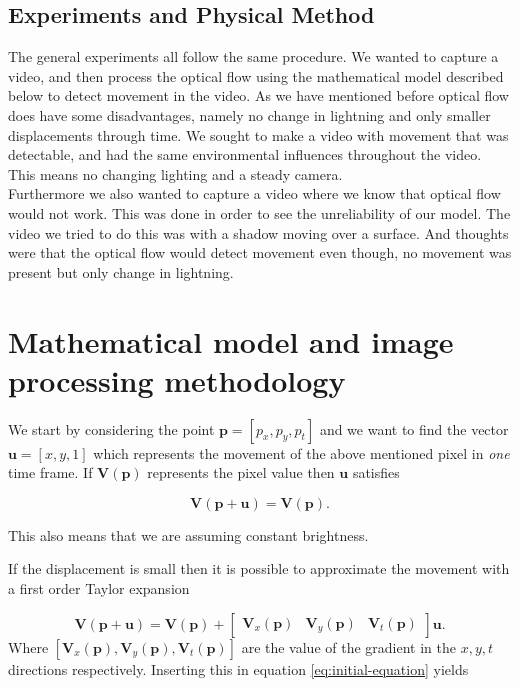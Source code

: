 \documentclass{article}
\begin{document}
\subsection{Experiments and Physical Method}
The general experiments all follow the same procedure. We wanted to capture a video, and then process the optical flow using the mathematical model described below to detect movement in the video.
As we have mentioned before optical flow does have some disadvantages, namely no change in lightning and only smaller displacements through time. We sought to make a video with movement that was detectable, and had the same environmental influences throughout the video. This means no changing lighting and a steady camera.
\\
Furthermore we also wanted to capture a video where we know that optical flow would not work. This was done in order to see the unreliability of our model. The video we tried to do this was with a shadow moving over a surface. And thoughts were that the optical flow would detect movement even though, no movement was present but only change in lightning.


\section{Mathematical model and image processing methodology}
We start by considering the point $\boldsymbol{p} = [p_x, p_y, p_t]$ and we want to find the vector $\boldsymbol{u} = [x, y, 1]$ which represents the movement of the above mentioned pixel in \emph{one} time frame. If $\boldsymbol{V(p)}$ represents the pixel value then $\boldsymbol{u}$ satisfies 

\begin{equation}\label{eq:initial-equation}
    \boldsymbol{V(p + u)} = \boldsymbol{V(p)}.
\end{equation}

This also means that we are assuming constant brightness.

If the displacement is small then it is possible to  approximate the movement with a first order Taylor expansion

\begin{equation}
    \boldsymbol{V(p + u)} = \boldsymbol{V(p)} + \begin{bmatrix}
        \boldsymbol{V}_x(\boldsymbol{p}) & \boldsymbol{V}_y(\boldsymbol{p}) & \boldsymbol{V}_t(\boldsymbol{p})
    \end{bmatrix} \boldsymbol{u}.
\end{equation}
Where $[\boldsymbol{V}_x(\boldsymbol{p}),\boldsymbol{V}_y(\boldsymbol{p}),\boldsymbol{V}_t(\boldsymbol{p})]$ are the value of the gradient in the $x,y,t$ directions respectively. Inserting this in equation \ref{eq:initial-equation} yields
\end{document}

